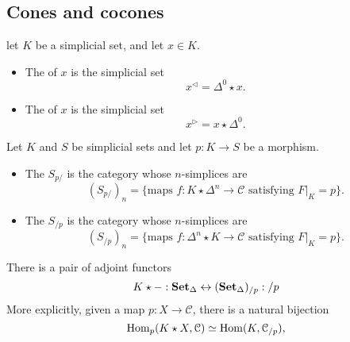 \documentclass[main.tex]{subfiles}
\begin{document}
\subsection{Cones and cocones}
\label{ssc:cones_and_cocones}

\begin{definition}
  \label{def:left_cone_right_cone}
  let $K$ be a simplicial set, and let $x \in K$.
  \begin{itemize}
    \item The  of $x$ is the simplicial set
      \begin{equation*}
        x^{\triangleleft} = \Delta^{0} \star x.
      \end{equation*}

    \item The  of $x$ is the simplicial set
      \begin{equation*}
        x^{\triangleright} = x \star \Delta^{0}.
      \end{equation*}
  \end{itemize}
\end{definition}


\begin{definition}
  \label{def:overcategory}
  Let $K$ and $S$ be simplicial sets and let $p\colon K \to S$ be a morphism.
  \begin{itemize}
    \item The  $S_{p/}$ is the category whose $n$-simplices are
      \begin{equation*}
        (S_{p/})_{n} = \{\text{maps }f\colon K \star \Delta^{n} \to \mathcal{C} \text{ satisfying }F|_{K} = p\}.
      \end{equation*}

    \item The  $S_{/p}$ is the category whose $n$-simplices are
      \begin{equation*}
        (S_{/p})_{n} = \{\text{maps }f\colon \Delta^{n} \star K \to \mathcal{C} \text{ satisfying }F|_{K} = p\}.
      \end{equation*}
  \end{itemize}
\end{definition}

\begin{theorem}
  There is a pair of adjoint functors
  \begin{equation*}
    K \star - : \operatorname{\mathbf{Set}_{\Delta}} \leftrightarrow (\operatorname{\mathbf{Set}_{\Delta}})_{/p} : /p
  \end{equation*}
  More explicitly, given a map $p\colon X \to \mathcal{C}$, there is a natural bijection
  \begin{equation*}
    \operatorname{Hom}_{p}(K \star X, \mathcal{C}) \simeq \operatorname{Hom}(K, \mathcal{C}_{/p}),
  \end{equation*}
\end{theorem}
\end{document}
